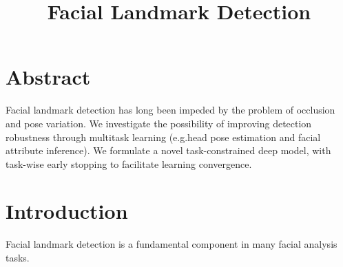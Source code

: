 

\title{Facial Landmark Detection}
\maketitle

\section{Abstract}
Facial landmark detection has long been impeded by the problem of occlusion and pose
variation. We investigate the possibility of improving detection robustness through
multitask learning (e.g.head pose estimation and facial attribute inference). We
formulate a novel task-constrained deep model, with task-wise early stopping to facilitate
learning convergence.

\section{Introduction}
Facial landmark detection is a fundamental component in many facial analysis tasks.


